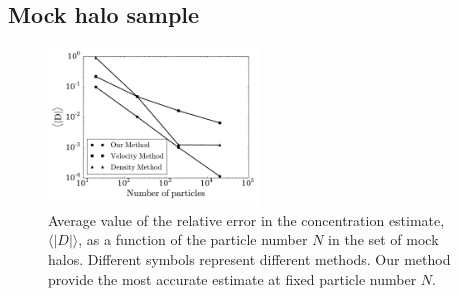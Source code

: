 \documentclass[a4,useAMS,usenatbib,usegraphicx]{mn2e}
\newcommand{\avg}[1]{\langle{#1}\rangle}
\begin{document}
\subsection{Mock halo sample}

\begin{figure}
\begin{center}
  \includegraphics[width=0.50\textwidth]{error.pdf}
\end{center}
\caption{Average value of the relative error in the concentration
  estimate, $\avg{|D|}$, as a function of the particle number $N$ in
  the set of mock halos. Different symbols represent different
  methods. Our method provide the most accurate estimate at fixed
  particle number $N$.  
    \label{fig:error}}
\end{figure}
\end{document}
